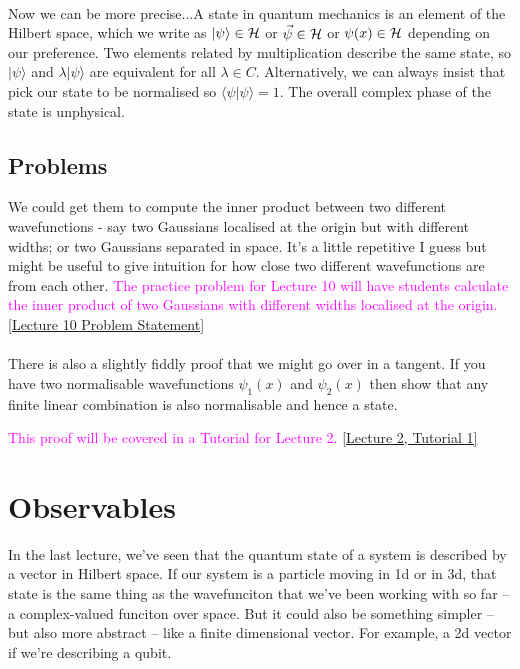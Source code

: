 \documentclass[12pt]{article}
\newcommand\para{\paragraph{}}
\newcommand{\ket}[1]{|#1\rangle}
\newcommand{\co}{\color{olive}}
\newcommand{\cblue}{\color{blue}}
\newcommand{\alyssa}{\textcolor{magenta}}
\begin{document}
{\para
Now we can be more precise...{\co A state in quantum mechanics is an element of the Hilbert space, which we write as $\ket{\psi}\in {\cal H}$ or  $\vec{\psi}\in {\cal H}$ or $\psi(x)\in {\cal H}$ depending on our preference. Two elements related by multiplication describe the same state, so $\ket{\psi}$ and $\lambda \ket{\psi}$ are equivalent for all $\lambda \in C$.  Alternatively, we can always insist that pick our state to be normalised so $\langle \psi|\psi\rangle =1$. The overall complex phase of the state is unphysical.}

\subsection{Problems}

{\cblue We could get them to compute the inner product between two different wavefunctions - say two Gaussians localised at the origin but with different widths; or two Gaussians separated in space. It's a little repetitive I guess but might be useful to give intuition for how close two different wavefunctions are from each other. \alyssa{The practice problem for Lecture 10 will have students calculate the inner product of two Gaussians with different widths localised at the origin.} \href{https://drive.google.com/file/d/1ZKVPQwYaagdpIA2RNrkCAwSgk6_wUmkk/view?usp=drive_link}{[Lecture 10 Problem Statement]}

\para
There is also a slightly fiddly proof that we might go over in a tangent. If you have two normalisable wavefunctions $\psi_1(x)$ and $\psi_2(x)$ then show that any finite linear combination is also normalisable and hence a state.} \alyssa{This proof will be covered in a Tutorial for Lecture 2.} \href{https://drive.google.com/file/d/15D_utjt-mdNEDmhK1WxOPFAAx-HqOa1U/view?usp=drive_link}{[Lecture 2, Tutorial 1]}



\newpage
\section{Observables}


In the last lecture, we've seen that the  quantum state of a system is described by a vector in Hilbert space. If our system is a particle moving in 1d or in 3d, that state is the same thing as the wavefunciton that we've been working with so far -- a complex-valued funciton over space. But it could also be something simpler -- but also more abstract -- like a finite dimensional vector. For example, a 2d vector if we're describing a qubit.

}
\end{document}
